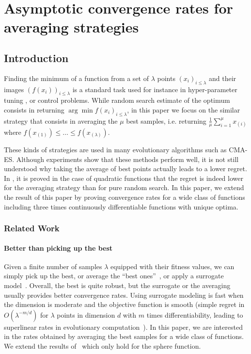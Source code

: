\chapter{Asymptotic convergence rates for averaging strategies}
\section{Introduction}
Finding the minimum of a function from a set of $\lambda$ points $(x_i)_{i\leq \lambda}$ and their images $(f(x_i))_{i\leq \lambda}$ is a standard task used for instance in hyper-parameter tuning \cite{bergstra2012random}, or control problems. While random search estimate of the optimum consists in returning $\arg\min f(x_i)_{i\leq \lambda}$, in this paper we focus on the similar strategy that consists in averaging the $\mu$ best samples, i.e. returning $\frac1\mu\sum_{i=1}^\mu x_{(i)}$ where $f(x_{(1)})\leq\ldots\leq f(x_{(\lambda)})$.

These kinds of strategies are used in many evolutionary algorithms such as CMA-ES. Although experiments show that these methods perform well, it is not still understood why taking the average of best points actually leads to a lower regret. In \cite{ppsnkbest}, it is proved in the case of quadratic functions that the regret is indeed lower for the averaging strategy than for pure random search. In this paper, we extend the result of this paper by proving convergence rates for a wide class of functions including three times continuously differentiable functions with unique optima.


\subsection{Related Work}

\subsubsection{Better than picking up the best}
Given a finite number of samples $\lambda$ equipped with their fitness values, we can simply pick up the best, or average the ``best ones''~\cite{beyerbenefitofsex,ppsnkbest}, or apply a surrogate model~\cite{sm1,sm2,sm3,AST,sm4,bach}. Overall, the best is quite robust, but the surrogate or the averaging usually provides  better convergence rates. Using surrogate modeling is fast when the dimension is moderate and the objective function is smooth (simple regret in $O(\lambda^{-m/d})$ for $\lambda$ points in dimension $d$ with $m$ times differentiability, leading to superlinear rates in evolutionary computation~\cite{AST}). In this paper, we are interested in the rates obtained by averaging the best samples for a wide class of functions. We extend the results of~\cite{ppsnkbest} which only hold for the sphere function.

